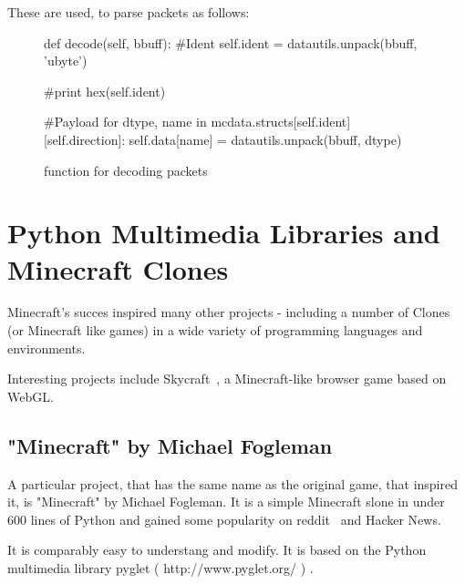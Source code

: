 These are used, to parse packets as follows:

		\begin{figure}[ht]
			\centering
			\begin{minipage}{11cm}
				\begin{pseudocode}
	def decode(self, bbuff):
		#Ident
		self.ident = datautils.unpack(bbuff, 'ubyte')
		
		#print hex(self.ident)
		
		#Payload
		for dtype, name in mcdata.structs[self.ident][self.direction]:
			self.data[name] = datautils.unpack(bbuff, dtype)
					\end{pseudocode}
				\caption{function for decoding packets}
				\label{snippet_position-packet}
			\end{minipage}
		\end{figure}

\section{Python Multimedia Libraries and Minecraft Clones}
Minecraft's succes inspired many other projects - including a number of Clones (or Minecraft like games) in a wide variety of programming languages and environments.

Interesting projects include Skycraft~\cite{skycraft}, a Minecraft-like browser game based on WebGL.

        \subsection{"Minecraft" by Michael Fogleman}
A particular project, that has the same name as the original game, that inspired it, is "Minecraft" by Michael Fogleman. It is a simple Minecraft slone in under 600 lines of Python and gained some popularity on reddit~\cite{fogle-reddit} and Hacker News.~\cite{fogle_hn}

It is comparably easy to understang and modify. It is based on the Python multimedia library pyglet ( http://www.pyglet.org/ ) .

